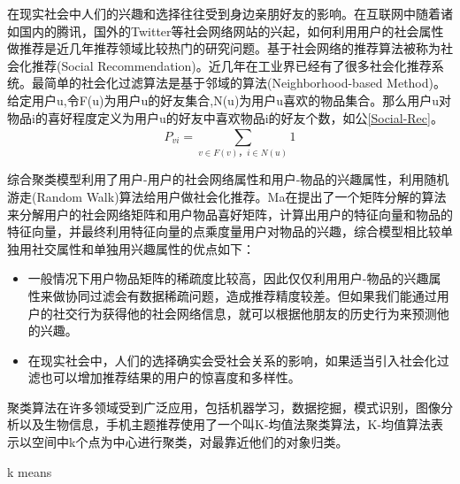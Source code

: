 		在现实社会中人们的兴趣和选择往往受到身边亲朋好友的影响。在互联网中随着诸如国内的腾讯，国外的Twitter等社会网络网站的兴起，如何利用用户的社会属性做推荐是近几年推荐领域比较热门的研究问题。基于社会网络的推荐算法被称为社会化推荐(Social Recommendation)。近几年在工业界已经有了很多社会化推荐系统。最简单的社会化过滤算法是基于邻域的算法(Neighborhood-based Method)。给定用户u,令F(u)为用户u的好友集合,N(u)为用户u喜欢的物品集合。那么用户u对物品i的喜好程度定义为用户u的好友中喜欢物品i的好友个数，如公\autoref{Social-Rec}。
		\begin{equation}
			P_{vi} = \sum_{v\in F(v)，i\in N(u)}^{} 1
			\label{Social-Rec}
		\end{equation}

		综合聚类模型利用了用户-用户的社会网络属性和用户-物品的兴趣属性，利用随机游走(Random Walk)\citep{Trust-walker}算法给用户做社会化推荐。Ma在提出了一个矩阵分解的算法来分解用户的社会网络矩阵和用户物品喜好矩阵，计算出用户的特征向量和物品的特征向量，并最终利用特征向量的点乘度量用户对物品的兴趣，综合模型相比较单独用社交属性和单独用兴趣属性的优点如下：
		\begin{itemize}
		\item 一般情况下用户物品矩阵的稀疏度比较高，因此仅仅利用用户-物品的兴趣属性来做协同过滤会有数据稀疏问题，造成推荐精度较差。但如果我们能通过用户的社交行为获得他的社会网络信息，就可以根据他朋友的历史行为来预测他的兴趣。
		\item 在现实社会中，人们的选择确实会受社会关系的影响，如果适当引入社会化过滤也可以增加推荐结果的用户的惊喜度和多样性。
		\end{itemize}

		聚类算法在许多领域受到广泛应用，包括机器学习，数据挖掘，模式识别，图像分析以及生物信息，手机主题推荐使用了一个叫K-均值法聚类算法，K-均值算法表示以空间中k个点为中心进行聚类，对最靠近他们的对象归类。
		\IncMargin{1em}
		\begin{algorithm}
			\BlankLine
		\caption{k means}\label{k-means}
		\end{algorithm}
		\DecMargin{1em}


